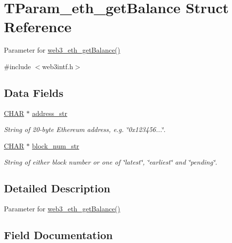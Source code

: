 \hypertarget{struct_t_param__eth__get_balance}{}\section{T\+Param\+\_\+eth\+\_\+get\+Balance Struct Reference}
\label{struct_t_param__eth__get_balance}


Parameter for \mbox{\hyperlink{web3intf_8c_a5d417a933aa22d1d1034feda5fa23e98}{web3\+\_\+eth\+\_\+get\+Balance()}}  




{\ttfamily \#include $<$web3intf.\+h$>$}

\subsection*{Data Fields}
\begin{DoxyCompactItemize}
\item 
\mbox{\hyperlink{boattypes_8h_aebb9e13210d88d43e32e735ada43a425}{C\+H\+AR}} $\ast$ \mbox{\hyperlink{struct_t_param__eth__get_balance_ab1b9f5fe62033b1d7fb013b2e8718c03}{address\+\_\+str}}
\begin{DoxyCompactList}\small\item\em String of 20-\/byte Ethereum address, e.\+g. \char`\"{}0x123456...\char`\"{}. \end{DoxyCompactList}\item 
\mbox{\hyperlink{boattypes_8h_aebb9e13210d88d43e32e735ada43a425}{C\+H\+AR}} $\ast$ \mbox{\hyperlink{struct_t_param__eth__get_balance_af78d86478ad38ef1fecad6bfb059bd27}{block\+\_\+num\+\_\+str}}
\begin{DoxyCompactList}\small\item\em String of either block number or one of \char`\"{}latest\char`\"{}, \char`\"{}earliest\char`\"{} and \char`\"{}pending\char`\"{}. \end{DoxyCompactList}\end{DoxyCompactItemize}


\subsection{Detailed Description}
Parameter for \mbox{\hyperlink{web3intf_8c_a5d417a933aa22d1d1034feda5fa23e98}{web3\+\_\+eth\+\_\+get\+Balance()}} 

\subsection{Field Documentation}
\mbox{\label{struct_t_param__eth__get_balance_ab1b9f5fe62033b1d7fb013b2e8718c03}} 
